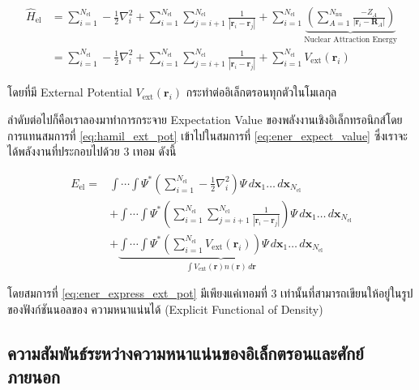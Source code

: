 \begin{align}\label{eq:hamil_ext_pot}
    \hat{H}_{\text{el}} & = \sum^{N_{\text{el}}}_{i=1} -\frac{1}{2} \nabla^{2}_{i}
    + \sum^{N_{\text{el}}}_{i=1} \sum^{N_{\text{el}}}_{j=i+1} \frac{1}{|\bm{r}_{i}-\bm{r}_{j}|}
    + \sum^{N_{\text{el}}}_{i=1}
    \underbrace{\left ( \sum^{N_{\text{nu}}}_{A=1} \frac{-Z_{A}}{|\bm{r}_{i}-\bm{R}_{A}|} \right )}%
    _{\text{Nuclear Attraction Energy}} \nonumber                                  \\
                        & = \sum^{N_{\text{el}}}_{i=1} -\frac{1}{2} \nabla^{2}_{i}
    + \sum^{N_{\text{el}}}_{i=1} \sum^{N_{\text{el}}}_{j=i+1} \frac{1}{|\bm{r}_{i}-\bm{r}_{j}|}
    + \sum^{N_{\text{el}}}_{i=1} V_{\text{ext}}(\bm{r}_{i})
\end{align}

\noindent โดยที่มี External Potential $V_{\text{ext}}(\bm{r}_{i})$ กระทำต่ออิเล็กตรอนทุกตัวในโมเลกุล

ลำดับต่อไปก็คือเราลองมาทำการกระจาย Expectation Value ของพลังงานเชิงอิเล็กทรอนิกส์โดยการแทนสมการที่ \eqref{eq:hamil_ext_pot}
เข้าไปในสมการที่ \eqref{eq:ener_expect_value} ซึ่งเราจะได้พลังงานที่ประกอบไปด้วย 3 เทอม ดังนี้

\begin{align}\label{eq:ener_express_ext_pot}
    E_{\text{el}} = & \int \cdots \int \Psi^{\ast}
    \left ( \sum^{N_{\text{el}}}_{i=1} -\frac{1}{2} \nabla^{2}_{i} \right )
    \Psi \, d\bm{x}_{1} \dots \, d\bm{x}_{N_{\text{el}}} \nonumber \\
                    & + \int \cdots \int \Psi^{\ast}
    \left ( \sum^{N_{\text{el}}}_{i=1} \sum^{N_{\text{el}}}_{j=i+1} \frac{1}{|\bm{r}_{i}-\bm{r}_{j}|} \right )
    \Psi \, d\bm{x}_{1} \dots \, d\bm{x}_{N_{\text{el}}} \nonumber \\
                    & + \underbrace{\int \cdots \int \Psi^{\ast}
    \left ( \sum^{N_{\text{el}}}_{i=1} V_{\text{ext}}(\bm{r}_{i}) \right )
    \Psi \, d\bm{x}_{1} \dots \, d\bm{x}_{N_{\text{el}}}%
    }_{\textstyle \int V_{\text{ext}}(\bm{r}) n(\bm{r}) \, d\bm{r}}
\end{align}

\noindent โดยสมการที่ \eqref{eq:ener_express_ext_pot} มีเพียงแค่เทอมที่ 3 เท่านั้นที่สามารถเขียนให้อยู่ในรูปของฟังก์ชันนอลของ%
ความหนาแน่นได้ (Explicit Functional of Density)

\subsection{ความสัมพันธ์ระหว่างความหนาแน่นของอิเล็กตรอนและศักย์ภายนอก}
\label{ssec:ener_density_ext_pot}

